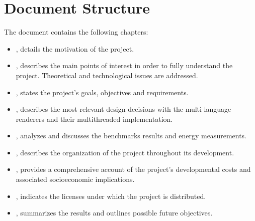 \section{Document Structure}\label{sec:structure}
The document contains the following chapters:
\begin{itemize}
  \item {}, details the motivation of the project.
  \item {}, describes the main points of interest in order to fully understand the project. Theoretical and technological issues are addressed.
  \item {}, states the project's goals, objectives and requirements.
  \item {}, describes the most relevant design decisions with the multi-language renderers and their multithreaded implementation.
  \item {}, analyzes and discusses the benchmarks results and energy measurements.
  \item {}, describes the organization of the project throughout its development.
  \item {}, provides a comprehensive account of the project's developmental costs and associated socioeconomic implications.
  \item {}, indicates the licenses under which the project is distributed.
  \item {}, summarizes the results and outlines possible future objectives.
\end{itemize}

